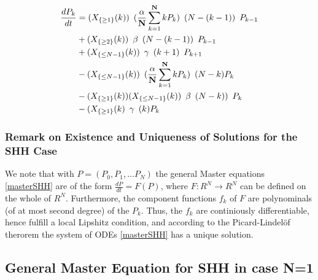 \documentclass[paper=a4, fontsize=11pt, twoside, BCOR=12mm, parskip=full, listof=totoc]{scrreprt}
\begin{document}
	\begin{equation}
	\label{masterSHH}
		\begin{aligned}
		{\frac{dP_k}{dt}} & =({X}_{ \{\geq 1 \}}(k))	\hspace{5pt} ( \frac{\alpha}{\bf{N}} \sum_{k=1}^{\bf N}kP_k ) 	\hspace{5pt} (N-(k-1)) \hspace{5pt} P_{k-1} 		\\
				 & +({X}_{ \{\geq 2 \}}(k))	\hspace{5pt} \beta 	\hspace{5pt} (N-(k-1)) \hspace{5pt} P_{k-1}		\\
				 & +({X}_{\{\leq N-1\}}(k)) \hspace{5pt} \gamma 	\hspace{5pt} (k+1) \hspace{5pt} P_{k+1}			\\
				 & -({X}_{\{\leq N-1\}}(k)) \hspace{5pt} ( \frac{\alpha}{\bf{N}} \sum_{k=1}^{\bf N}kP_k ) 	\hspace{5pt} (N-k)P_{k}				\\
				 & -({X}_{ \{\geq 1 \}}(k))({X}_{\{\leq N-1\}}(k)) \hspace{5pt} \beta \hspace{5pt} (N-k)) \hspace{5pt} P_{k}	\\
				 & -({X}_{ \{\geq 1 \}}(k)    \hspace{5pt}  \gamma 	\hspace{5pt} (k)P_{k}
		\end{aligned}
	\end{equation}



\subsubsection*{Remark on Existence and Uniqueness of Solutions for the SHH Case}

We note that with $P=(P_0,P_1,...P_N)$ the general Master equations \ref{masterSHH} are of the form $\frac{dP}{dt}=F(P)$, where $F: R^N\rightarrow R^N$ can be defined on the whole of $R^N$.
Furthermore, the component functions $f_k$ of $F$ are polynominals (of at most second degree) of the $P_k$.
Thus, the $f_k$ are continiously differentiable, hence fulfill a local Lipshitz condition, and according to the Picard-Lindelöf therorem the system of ODEs \ref{masterSHH} has a unique solution.

\subsection*{General Master Equation for SHH in case N=1}
\end{document}
